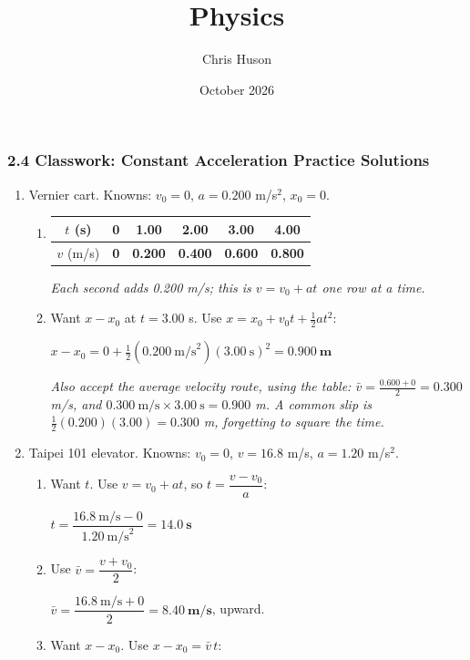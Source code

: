 \documentclass[12pt, twoside]{article}
\title{Physics}
\author{Chris Huson}
\date{October 2026}
\begin{document}
\subsubsection*{2.4 Classwork: Constant Acceleration Practice Solutions}

\begin{enumerate}[itemsep=0.5cm]

\item Vernier cart. Knowns: $v_0 = 0$, $a = 0.200$ m/s$^2$, $x_0 = 0$.
  \begin{enumerate}[itemsep=0.3cm]
    \item \renewcommand{\arraystretch}{1.4}
      \begin{tabular}[t]{| c | c | c | c | c | c |}
        \hline
        $t$ (s) & 0 & 1.00 & 2.00 & 3.00 & 4.00 \\ \hline
        $v$ (m/s) & \textbf{0} & \textbf{0.200} & \textbf{0.400} & \textbf{0.600}
          & \textbf{0.800} \\ \hline
      \end{tabular}

      \emph{Each second adds 0.200 m/s; this is $v = v_0 + at$ one row at a time.}
    \item Want $x - x_0$ at $t = 3.00$ s. Use $x = x_0 + v_0 t + \frac{1}{2}at^2$:

      $x - x_0 = 0 + \tfrac{1}{2}(0.200~\text{m/s}^2)(3.00~\text{s})^2
      = \mathbf{0.900~\textbf{m}}$

      \emph{Also accept the average velocity route, using the table:
      $\bar{v} = \frac{0.600 + 0}{2} = 0.300$ m/s, and
      $0.300~\text{m/s} \times 3.00~\text{s} = 0.900$ m. A common slip is
      $\frac{1}{2}(0.200)(3.00) = 0.300$ m, forgetting to square the time.}
  \end{enumerate}

\item Taipei 101 elevator. Knowns: $v_0 = 0$, $v = 16.8$ m/s,
  $a = 1.20$ m/s$^2$.
  \begin{enumerate}[itemsep=0.3cm]
    \item Want $t$. Use $v = v_0 + at$, so $t = \dfrac{v - v_0}{a}$:

      $t = \dfrac{16.8~\text{m/s} - 0}{1.20~\text{m/s}^2}
      = \mathbf{14.0~\textbf{s}}$
    \item Use $\bar{v} = \dfrac{v + v_0}{2}$:

      $\bar{v} = \dfrac{16.8~\text{m/s} + 0}{2} = \mathbf{8.40~\textbf{m/s}}$, upward.
    \item Want $x - x_0$. Use $x - x_0 = \bar{v}\,t$:


\end{enumerate}
\end{enumerate}
\end{document}
